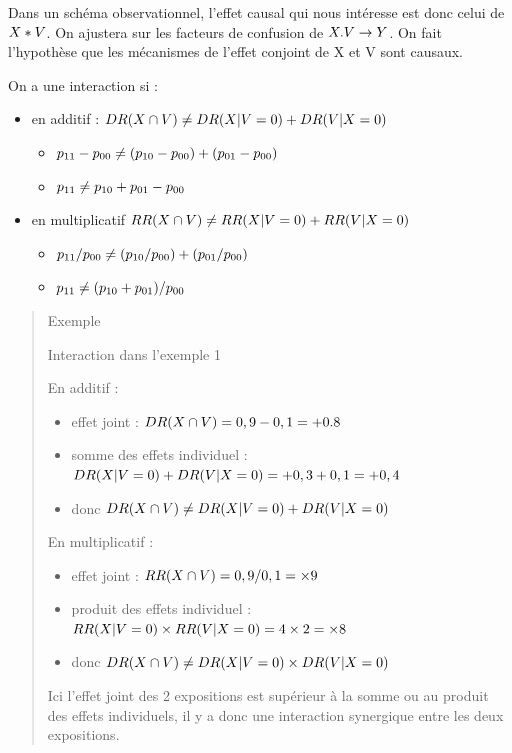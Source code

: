 \documentclass[
]{book}
\providecommand{\tightlist}{%
  \setlength{\itemsep}{0pt}\setlength{\parskip}{0pt}}
\begin{document}
Dans un schéma observationnel, l'effet causal qui nous intéresse est donc celui de \(\small X*V\). On ajustera sur les facteurs de confusion de \(\small X.V \rightarrow Y\).
On fait l'hypothèse que les mécanismes de l'effet conjoint de X et V sont causaux.

On a une interaction si :

\begin{itemize}
\tightlist
\item
  en additif : \(\small DR(X \cap V) \neq DR(X| V=0) + DR(V| X=0)\)

  \begin{itemize}
  \tightlist
  \item
    \(\small p_{11}-p_{00} \neq (p_{10}-p_{00})+(p_{01}-p_{00})\)
  \item
    \(\small p_{11} \neq p_{10} + p_{01} - p_{00}\)
  \end{itemize}
\item
  en multiplicatif \(\small RR(X \cap V) \neq RR(X| V=0) + RR(V| X=0)\)

  \begin{itemize}
  \tightlist
  \item
    \(\small p_{11}/p_{00} \neq (p_{10}/p_{00})+(p_{01}/p_{00})\)
  \item
    \(\small p_{11} \neq (p_{10} + p_{01}) / p_{00}\)
  \end{itemize}
\end{itemize}

\begin{quote}
Exemple

Interaction dans l'exemple 1

En additif :

\begin{itemize}
\tightlist
\item
  effet joint : \(\small DR(X \cap V) = 0,9 - 0,1 = +0.8\)
\item
  somme des effets individuel : \(\small DR(X| V=0) + DR(V| X=0) = +0,3 +0,1 = +0,4\)
\item
  donc \(\small DR(X \cap V) \neq DR(X| V=0) + DR(V| X=0)\)
\end{itemize}

En multiplicatif :

\begin{itemize}
\tightlist
\item
  effet joint : \(\small RR(X \cap V) = 0,9/0,1 = \times 9\)
\item
  produit des effets individuel : \(\small RR(X | V=0) \times RR(V | X=0) = 4 \times 2 = \times 8\)
\item
  donc \(\small DR(X \cap V) \neq DR(X| V=0) \times DR(V| X=0)\)
\end{itemize}

Ici l'effet joint des 2 expositions est supérieur à la somme ou au produit des effets individuels, il y a donc une interaction synergique entre les deux expositions.
\end{quote}
\end{document}
